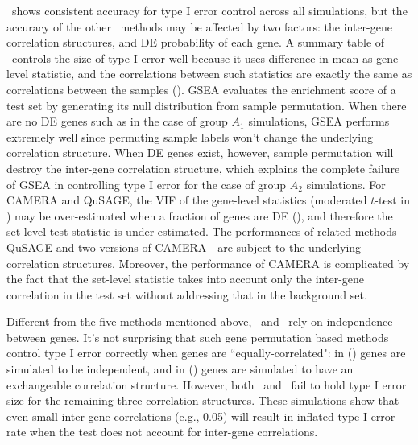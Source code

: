 	\OurMethod~shows consistent accuracy for type I error control across all simulations, but the
	accuracy of the other \HowmanyTest~methods may be affected by two factors: the inter-gene
	correlation structures, and DE probability of each gene. A summary table of  
	\OurMethod~controls the size of type I
	error well because it uses difference in mean as gene-level statistic, and the correlations 
	between
	such statistics are exactly the same as correlations between the samples 
	(\thepapertobefinished).
	GSEA evaluates the enrichment score
	of a test set by generating its null distribution from sample permutation. When there are no DE 
	genes
	such as in the case of group $A_1$ simulations, GSEA performs extremely well since permuting 
	sample
	labels won't change the underlying correlation structure. When DE genes exist, however, sample
	permutation will destroy the inter-gene correlation structure, which explains the complete 
	failure
	of GSEA in controlling type I error for the case of group $A_2$ simulations. For CAMERA and 
	QuSAGE,
	the VIF of the gene-level statistics (moderated $t$-test in \cite{wu2012camera}) may be
	over-estimated when a fraction of genes are DE (\thepapertobefinished), and therefore the 
	set-level
	test statistic is under-estimated. The performances of related methods---QuSAGE and two 
	versions of
	CAMERA---are subject to the underlying correlation structures. 
	Moreover, the performance of CAMERA is complicated by the fact that the set-level statistic 
	takes into account only the inter-gene correlation in the test set without addressing that in 
	the	background set.
	
	Different from the five methods mentioned above, \gent~and \genr~rely on independence between
	genes. It's not surprising that such gene permutation based methods control type I
	error correctly when genes are ``equally-correlated": in (\aaCase) genes are simulated to be
	independent, and in (\cCase) genes are simulated to have an exchangeable correlation structure.
	However, both \gent~and \genr~fail to hold type I error size for the remaining three correlation
	structures. These simulations show that even small inter-gene correlations (e.g., 0.05) will 
	result in inflated type I error rate when the test does not account for inter-gene 
	correlations.  
	
	
